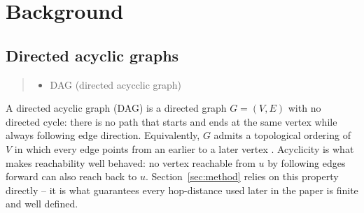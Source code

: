 \section{Background}
\subsection{Directed acyclic graphs}
\begin{quote}\small\itshape
\begin{itemize}
\item DAG (directed acycclic graph)
\end{itemize}
\end{quote}
A directed acyclic graph (DAG) is a directed graph $G = (V, E)$ with no
directed cycle: there is no path that starts and ends at the same vertex
while always following edge direction. Equivalently, $G$ admits a
topological ordering of $V$ in which every edge points from an earlier to a
later vertex .
Acyclicity is what makes reachability well behaved: no vertex reachable from
$u$ by following edges forward can also reach back to $u$. Section~\ref{sec:method}
relies on this property directly -- it is what guarantees every hop-distance
used later in the paper is finite and well defined.

